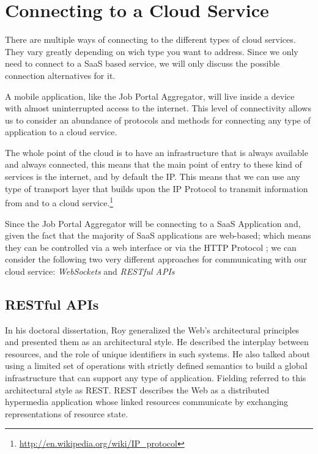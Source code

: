 \chapter{Connecting to a Cloud Service}\label{ch:conn_cloud}

There are multiple ways of connecting to the different types of cloud services. They vary greatly depending on wich type you want to address. Since we only need to connect to a \ac{SaaS} based service, we will only discuss the possible connection alternatives for it.

A mobile application, like the Job Portal Aggregator, will live inside a device with almost uninterrupted access to the internet. This level of connectivity allows us to consider an abundance of protocols and methods for connecting any type of application to a cloud service.

The whole point of the cloud is to have an infrastructure that is always available and always connected, this means that the main point of entry to these kind of services is the internet, and by default the \ac{IP}. This means that we can use any type of transport layer that builds upon the \ac{IP} Protocol to transmit information from and to a cloud service.\footnote{\url{http://en.wikipedia.org/wiki/IP_protocol}}  

Since the Job Portal Aggregator will be connecting to a \ac{SaaS} Application and, given the fact that the majority of \ac{SaaS} applications are web-based; which means they can be controlled via a web interface or via the HTTP Protocol \cite{mcwherter:2012}; we can consider the following two very different approaches for communicating with our cloud service: \textit{WebSockets} and \textit{RESTful APIs}

\section{RESTful APIs}
In his doctoral dissertation, Roy \citeauthor{fielding:2000} generalized the Web's architectural principles and presented them as an architectural style. He described the interplay between resources, and the role of unique identifiers in such systems. He also talked about using a limited set of operations with strictly defined semantics to build a global infrastructure that can support any type of application. Fielding referred to this architectural style as \ac{REST}. \ac{REST} describes the Web as a distributed hypermedia application whose linked resources communicate by exchanging representations of resource state. \cite{webber:2010}

